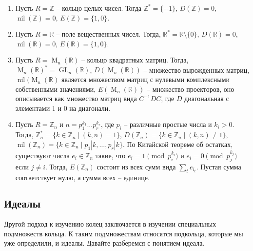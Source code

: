 \begin{examples}
\begin{enumerate}
\item Пусть $R = \mathbb Z$ -- кольцо целых чисел.
Тогда $\mathbb Z^* = \{\pm 1\}$, $D(\mathbb Z) = 0$, $\operatorname{nil}(\mathbb Z) =  0$, $E(\mathbb Z) = \{1, 0\}$.

\item Пусть $R = \mathbb R$ -- поле вещественных чисел.
Тогда, $\mathbb R^* = \mathbb R\setminus\{0\}$, $D(\mathbb R) = 0$, $\operatorname{nil}(\mathbb R) = 0$, $E(\mathbb R) = \{1, 0\}$.

\item Пусть $R = \operatorname{M}_n(\mathbb R)$ -- кольцо квадратных матриц.
Тогда, $\operatorname{M}_n(\mathbb R)^* = \operatorname{GL}_n(\mathbb R)$, $D(\operatorname{M}_n(\mathbb R))$ -- множество вырожденных матриц, $\operatorname{nil}(\operatorname{M}_n(\mathbb R)$ является множеством матриц с нулевыми комплексными собственными значениями, $E(\operatorname{M}_n(\mathbb R))$ -- множество проекторов, оно описывается как множество матриц вида $C^{-1}DC$, где $D$ диагональная с элементами $1$ и $0$ на диагонали.

\item Пусть $R = \mathbb Z_n$ и $n = p_1^{k_1}\ldots p_r^{k_r}$, где $p_i$ -- различные простые числа и $k_i > 0$.
Тогда, $\mathbb Z_n^* = \{k\in \mathbb Z_n\mid (k, n) = 1\}$, $D(\mathbb Z_n) = \{k\in \mathbb Z_n\mid (k, n) \neq 1\}$, $\operatorname{nil}(\mathbb Z_n) = \{k\in \mathbb Z_n\mid p_1|k,\ldots,p_r|k\}$.
По Китайской теореме об остатках, существуют числа $e_i\in \mathbb Z_n$ такие, что $e_i = 1 \pmod{p_i^{k_i}}$ и $e_i = 0\pmod{p_j^{k_j}}$ если $j\neq i$.
Тогда, $E(\mathbb Z_n)$ состоит из всех сумм вида $\sum_{t} e_{i_t}$.
Пустая сумма соответствует нулю, а сумма всех -- единице.
\end{enumerate}
\end{examples}

\subsection{Идеалы}

Другой подход к изучению колец заключается в изучении специальных подмножеств кольца.
К таким подмножествам относятся подкольца, которые мы уже определили, и идеалы.
Давайте разберемся с понятием идеала.

